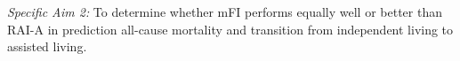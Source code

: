 \emph{Specific Aim 2:} To determine whether mFI performs equally well or better than RAI-A in prediction all-cause mortality and transition from independent living to assisted living.